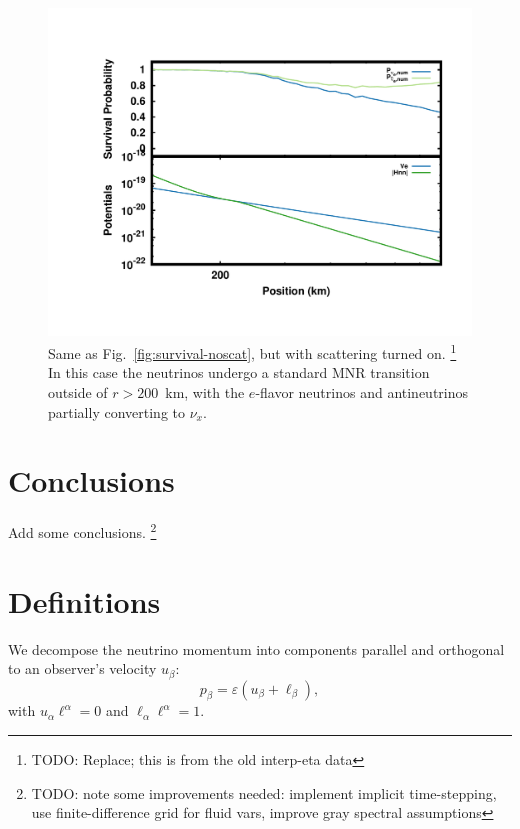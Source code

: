 \documentclass[aps,floatfix,prd,superscriptaddress,twocolumn]{revtex4-1}
\begin{document}
\begin{figure}
  \includegraphics[width=\columnwidth]{fig-survival_prob-scat_nh}
  \caption{Same as Fig.~\ref{fig:survival-noscat},
    but with scattering turned on.
    \footnote{TODO: Replace; this is from the old interp-eta data}
    In this case the neutrinos undergo a standard MNR transition
    outside of $r>200$~km,
    with the $e$-flavor neutrinos and antineutrinos
    partially converting to $\nu_x$.
    }
  \label{fig:survival-scat}
\end{figure}

\section{Conclusions}
\label{sec:conclusions}
Add some conclusions.
\footnote{TODO: note some improvements needed: implement implicit time-stepping,
  use finite-difference grid for fluid vars, improve gray spectral assumptions}

\appendix

\section{Definitions}
\label{sec:definitions}
We decompose the neutrino momentum into components parallel and orthogonal to
an observer's velocity $u_\beta$:
\begin{equation}
  \label{eqn:def_momentum_2}
  p_\beta = \varepsilon (u_\beta + \ell_\beta),
\end{equation}
with $u_\alpha\ell^\alpha=0$ and $\ell_\alpha\ell^\alpha=1$.
\end{document}
